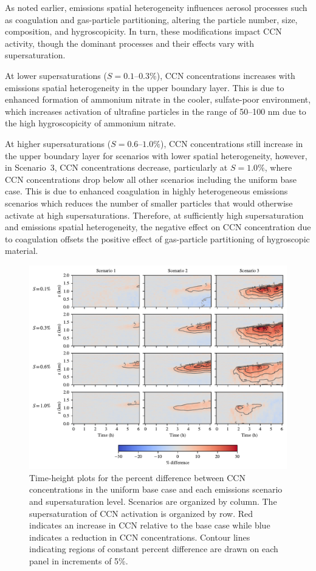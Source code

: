 \documentclass[journal abbreviation, manuscript]{copernicus}
\begin{document}
As noted earlier, emissions spatial heterogeneity influences aerosol
processes such as coagulation and gas-particle partitioning, altering
the particle number, size, composition, and hygroscopicity. In turn, these
modifications impact CCN activity, though the dominant
processes and their effects vary with supersaturation.

At lower supersaturations ($S=0.1\text{--}0.3\%$), CCN concentrations 
increases with emissions spatial heterogeneity
in the upper boundary layer. This is due to enhanced formation of
ammonium nitrate in the cooler, sulfate-poor environment, which
increases activation of ultrafine particles in the range of 50--100 nm
due to the high hygroscopicity of ammonium nitrate.

At higher supersaturations ($S=0.6\text{--}1.0\%$), CCN concentrations
still increase in the upper boundary layer for scenarios with lower
spatial heterogeneity, however, in Scenario~3, CCN concentrations
decrease, particularly at $S=1.0\%$, where CCN concentrations drop
below all other scenarios including the uniform base case. This is due to 
enhanced coagulation in highly heterogeneous
emissions scenarios which reduces the number of smaller particles that would
otherwise activate at high supersaturations.  Therefore, at
sufficiently high supersaturation and emissions spatial heterogeneity,
the negative effect on CCN concentration due to coagulation offsets
the positive effect of gas-particle partitioning of hygroscopic
material.

\begin{figure}[!h]
	\centering
	\includegraphics[]{figures/height-time-ccn-pdiff-multi-scenario.pdf}
	\caption{Time-height plots for the percent difference between
          CCN concentrations in the uniform base case and each
          emissions scenario and supersaturation level. Scenarios are
          organized by column. The supersaturation of CCN activation
          is organized by row. Red indicates an increase in CCN
          relative to the base case while blue indicates a reduction
          in CCN concentrations. Contour lines indicating regions of
          constant percent difference are drawn on each panel in
          increments of 5\%.}
	\label{fig:time-height-ccn-pdiff}
\end{figure} 
\end{document}
